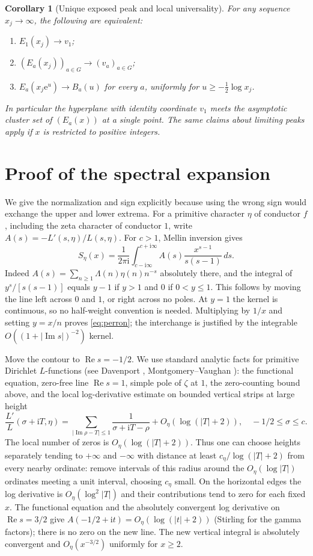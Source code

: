 \documentclass[11pt]{article}
\newtheorem{corollary}[theorem]{Corollary}
\theoremstyle{remark}\newtheorem{remark}[theorem]{Remark}
\newcommand{\Rea}{\operatorname{Re}}
\newcommand{\Ima}{\operatorname{Im}}
\newcommand{\e}{\mathrm{e}}
\newcommand{\ii}{\mathrm{i}}
\begin{document}
\begin{corollary}[Unique exposed peak and local universality]\label{cor:local}
For any sequence $x_j\to\infty$, the following are equivalent:
\begin{enumerate}
\item $E_1(x_j)\to v_1$;
\item $(E_a(x_j))_{a\in G}\to(v_a)_{a\in G}$;
\item $E_a(x_j\e^u)\to B_a(u)$ for every $a$, uniformly for $u\ge-\tfrac12\log x_j$.
\end{enumerate}
In particular the hyperplane with identity coordinate $v_1$ meets the asymptotic cluster set of $(E_a(x))$ at a single point. The same claims about limiting peaks apply if $x$ is restricted to positive integers.
\end{corollary}

\section{Proof of the spectral expansion}
We give the normalization and sign explicitly because using the wrong sign would exchange the upper and lower extrema. For a primitive character $\eta$ of conductor $f$, including the zeta character of conductor $1$, write $A(s)=-L'(s,\eta)/L(s,\eta)$. For $c>1$, Mellin inversion gives
\begin{equation}\label{eq:perron}
 S_\eta(x)=\frac1{2\pi\ii}\int_{c-\ii\infty}^{c+\ii\infty}
      A(s)\frac{x^{s-1}}{s(s-1)}\,ds.
\end{equation}
Indeed $A(s)=\sum_{n\ge1}\Lambda(n)\eta(n)n^{-s}$ absolutely there, and the integral of $y^s/[s(s-1)]$ equals $y-1$ if $y>1$ and $0$ if $0<y\le1$. This follows by moving the line left across $0$ and $1$, or right across no poles. At $y=1$ the kernel is continuous, so no half-weight convention is needed. Multiplying by $1/x$ and setting $y=x/n$ proves \eqref{eq:perron}; the interchange is justified by the integrable $O((1+|\Ima s|)^{-2})$ kernel.

Move the contour to $\Rea s=-1/2$. We use standard analytic facts for primitive Dirichlet $L$-functions (see Davenport \cite{davenport}, Montgomery--Vaughan \cite{mv}): the functional equation, zero-free line $\Rea s=1$, simple pole of $\zeta$ at $1$, the zero-counting bound above, and the local log-derivative estimate on bounded vertical strips at large height
\[
 \frac{L'}{L}(\sigma+\ii T,\eta)
 =\sum_{|\Ima\rho-T|\le1}\frac{1}{\sigma+\ii T-\rho}
   +O_\eta(\log(|T|+2)),\quad -1/2\le\sigma\le c.
\]
The local number of zeros is $O_\eta(\log(|T|+2))$. Thus one can choose heights separately tending to $+\infty$ and $-\infty$ with distance at least $c_\eta/\log(|T|+2)$ from every nearby ordinate: remove intervals of this radius around the $O_\eta(\log |T|)$ ordinates meeting a unit interval, choosing $c_\eta$ small. On the horizontal edges the log derivative is $O_\eta(\log^2 |T|)$ and their contributions tend to zero for each fixed $x$. The functional equation and the absolutely convergent log derivative on $\Rea s=3/2$ give $A(-1/2+\ii t)=O_\eta(\log(|t|+2))$ (Stirling for the gamma factors); there is no zero on the new line. The new vertical integral is absolutely convergent and $O_\eta(x^{-3/2})$ uniformly for $x\ge2$.
\end{document}
